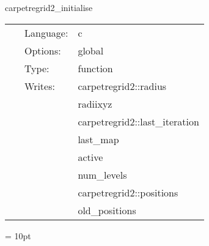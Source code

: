 \vspace{5mm}


\hspace{5mm} carpetregrid2\_initialise 

\hspace{5mm}{\it initialise locations of refined regions } 


\hspace{5mm}

 \begin{tabular*}{160mm}{cll} 
~ & Language:  & c \\ 
~ & Options:  & global \\ 
~ & Type:  & function \\ 
~ & Writes:  & carpetregrid2::radius \\ 
~& ~ &radiixyz\\ 
~& ~ &carpetregrid2::last\_iteration\\ 
~& ~ &last\_map\\ 
~& ~ &active\\ 
~& ~ &num\_levels\\ 
~& ~ &carpetregrid2::positions\\ 
~& ~ &old\_positions\\ 
\end{tabular*} 



\vspace{5mm}\parskip = 10pt 

